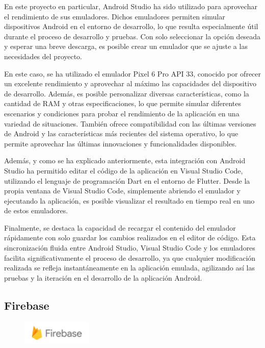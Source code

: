 \documentclass{article}
\begin{document}
En este proyecto en particular, Android Studio ha sido utilizado para aprovechar el rendimiento de sus emuladores. Dichos emuladores permiten simular dispositivos Android en el entorno de desarrollo, lo que resulta especialmente útil durante el proceso de desarrollo y pruebas. Con solo seleccionar la opción deseada y esperar una breve descarga, es posible crear un emulador que se ajuste a las necesidades del proyecto.

En este caso, se ha utilizado el emulador Pixel 6 Pro API 33, conocido por ofrecer un excelente rendimiento y aprovechar al máximo las capacidades del dispositivo de desarrollo. Además, es posible personalizar diversas características, como la cantidad de RAM y otras especificaciones, lo que permite simular diferentes escenarios y condiciones para probar el rendimiento de la aplicación en una variedad de situaciones. También ofrece compatibilidad con las últimas versiones de Android y las características más recientes del sistema operativo, lo que permite aprovechar las últimas innovaciones y funcionalidades disponibles.

Además, y como se ha explicado anteriormente, esta integración con Android Studio ha permitido editar el código de la aplicación en Visual Studio Code, utilizando el lenguaje de programación Dart en el entorno de Flutter. Desde la propia ventana de Visual Studio Code, simplemente abriendo el emulador y ejecutando la aplicación, es posible visualizar el resultado en tiempo real en uno de estos emuladores.

Finalmente, se destaca la capacidad de recargar el contenido del emulador rápidamente con solo guardar los cambios realizados en el editor de código. Esta sincronización fluida entre Android Studio, Visual Studio Code y los emuladores facilita significativamente el proceso de desarrollo, ya que cualquier modificación realizada se refleja instantáneamente en la aplicación emulada, agilizando así las pruebas y la iteración en el desarrollo de la aplicación Android.

\subsection{Firebase}

\begin{figure}[h]
    \centering
    \includegraphics[width=0.3\textwidth]{imagenes/logos/logo_firebase.png}
\end{figure}
\end{document}

